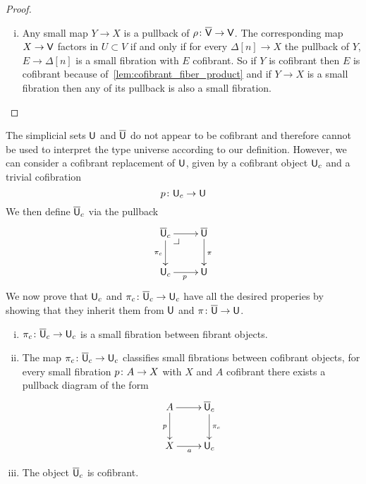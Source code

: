 \documentclass[reqno,10pt,a4paper,oneside,draft]{amsart}
\begin{document}
\begin{proof}
\begin{enumerate}[(i)]
\item Any small map $Y \rightarrow X$ is a pullback of $\rho \colon \overline{\mathsf{V}} \rightarrow \mathsf{V}$. The corresponding map $X \rightarrow \mathsf{V}$ factors in $U \subset V$ if and only if for every $\Delta[n] \rightarrow X$ the pullback of $Y$, $E \rightarrow \Delta[n]$ is a small fibration with $E$ cofibrant. So if $Y$ is cofibrant then $E$ is cofibrant because of~\cref{lem:cofibrant_fiber_product} and if $Y \rightarrow X$ is a small fibration then any of its pullback is also a small fibration.  \qedhere
\end{enumerate}
\end{proof} 



The simplicial sets $\mathsf{U}$ and $\overline{\mathsf{U}}$ do not appear to be cofibrant and therefore cannot be used to interpret the type universe according to our definition. However, we can consider a cofibrant replacement of $\mathsf{U}$, given by a cofibrant object $\mathsf{U}_c$ and a trivial cofibration
\begin{equation}
\label{equ:ucu}
p \colon \mathsf{U}_c \rightarrow \mathsf{U}
\end{equation}
We then define $\overline{\mathsf{U}}_c$ via the pullback
\[
\xymatrix{
\UU_c \ar[d]_{\pi_c} \ar[r] \drpullback & \UU \ar[d]^{\pi}  \\
\U_c \ar[r]_p & \U}
\]
We now prove that $\mathsf{U}_c$ and $\pi_c \colon \overline{\mathsf{U}}_c \to \mathsf{U}_c$ have all the desired properies by showing that 
they inherit them from $\mathsf{U}$ and $\pi \colon \overline{\mathsf{U}} \to \mathsf{U}$.


\begin{proposition} \label{thm:universe-uc} 
\hfill 
\begin{enumerate}[(i)] 
\item $\pi_c \colon \overline{\mathsf{U}}_c \to \mathsf{U}_c$ is a small fibration between fibrant objects. 
\item The map $\pi_c \colon \overline{\mathsf{U}}_c \to \mathsf{U}_c$ classifies small fibrations between cofibrant objects, \ie 
for every small fibration $p \colon A \to X$ with $X$ and $A$ cofibrant there exists a pullback diagram of the form
\[
\xymatrix{
A \ar[r] \ar[d]_p & \UU_c \ar[d]^{\pi_c} \\
X \ar[r]_a & \U_c }
\]
\item The object $\overline{\mathsf{U}}_c$ is cofibrant. 
\end{enumerate}
\end{proposition}
\end{document}
